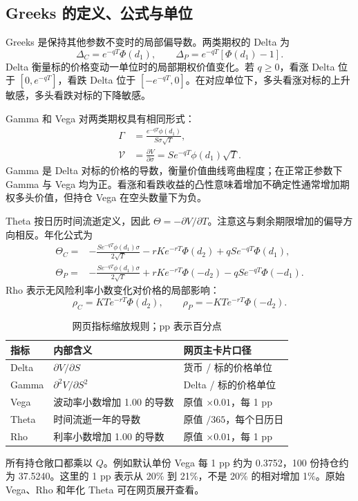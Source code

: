 \documentclass[UTF8,a4paper,12pt]{ctexart}
\begin{document}
\subsection{Greeks 的定义、公式与单位}
Greeks 是保持其他参数不变时的局部偏导数。两类期权的 Delta 为
\begin{equation}
\Delta_C=e^{-qT}\Phi(d_1),\qquad
\Delta_P=e^{-qT}[\Phi(d_1)-1].
\end{equation}
Delta 衡量标的价格变动一单位时的局部期权价值变化。若 $q\ge0$，看涨 Delta 位于 $[0,e^{-qT}]$，看跌 Delta 位于 $[-e^{-qT},0]$。在对应单位下，多头看涨对标的上升敏感，多头看跌对标的下降敏感。

Gamma 和 Vega 对两类期权具有相同形式：
\begin{align}
\Gamma&=\frac{e^{-qT}\phi(d_1)}{S\sigma\sqrt T},\\
\mathcal V&=\frac{\partial V}{\partial\sigma}=Se^{-qT}\phi(d_1)\sqrt T.
\end{align}
Gamma 是 Delta 对标的价格的导数，衡量价值曲线弯曲程度；在正常正参数下 Gamma 与 Vega 均为正。看涨和看跌收益的凸性意味着增加不确定性通常增加期权多头价值，但持仓 Vega 在空头数量下为负。

Theta 按日历时间流逝定义，因此 $\Theta=-\partial V/\partial T$。注意这与剩余期限增加的偏导方向相反。年化公式为
\begin{align}
\Theta_C={}&-\frac{Se^{-qT}\phi(d_1)\sigma}{2\sqrt T}
-rKe^{-rT}\Phi(d_2)+qSe^{-qT}\Phi(d_1),\\
\Theta_P={}&-\frac{Se^{-qT}\phi(d_1)\sigma}{2\sqrt T}
+rKe^{-rT}\Phi(-d_2)-qSe^{-qT}\Phi(-d_1).
\end{align}
Rho 表示无风险利率小数变化对价格的局部影响：
\begin{equation}
\rho_C=KT e^{-rT}\Phi(d_2),\qquad
\rho_P=-KT e^{-rT}\Phi(-d_2).
\end{equation}

\begin{table}[H]\centering\small
\begin{tabularx}{\linewidth}{lXX}\toprule 指标 & 内部含义 & 网页主卡片口径\\\midrule
Delta & $\partial V/\partial S$ & 货币 / 标的价格单位\\
Gamma & $\partial^2 V/\partial S^2$ & Delta / 标的价格单位\\
Vega & 波动率小数增加 1.00 的导数 & 原值 $\times0.01$，每 1 pp\\
Theta & 时间流逝一年的导数 & 原值 $/365$，每个日历日\\
Rho & 利率小数增加 1.00 的导数 & 原值 $\times0.01$，每 1 pp\\\bottomrule
\end{tabularx}\caption{网页指标缩放规则；pp 表示百分点}
\end{table}
所有持仓敞口都乘以 $Q$。例如默认单份 Vega 每 1 pp 约为 0.3752，100 份持仓约为 37.5240。这里的 1 pp 表示从 20\% 到 21\%，不是 20\% 的相对增加 1\%。原始 Vega、Rho 和年化 Theta 可在网页展开查看。
\newpage
\end{document}
